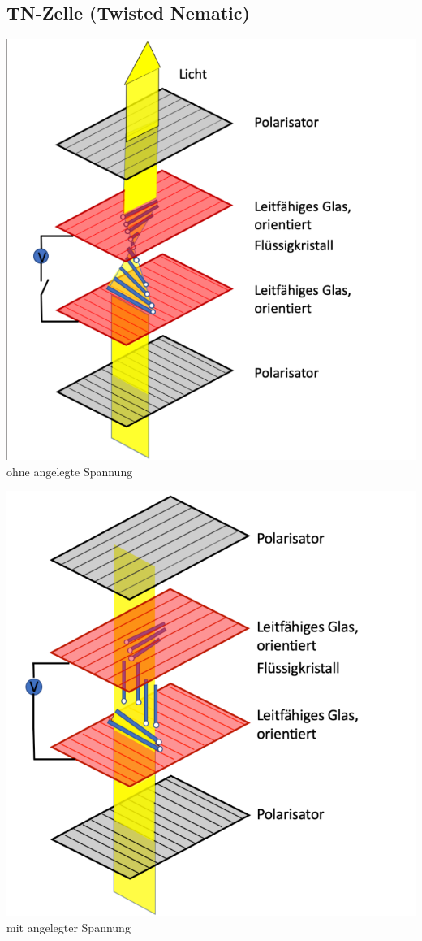 \subsection{TN-Zelle (Twisted Nematic)}
\begin{minipage}[t]{0.5\linewidth}
    \includegraphics[width=\linewidth]{pictures/TN-Zelle1.png}
    ohne angelegte Spannung
\end{minipage}
\begin{minipage}[t]{0.5\linewidth}
    \includegraphics[width=\linewidth]{pictures/TN-Zelle2.png} 
    mit angelegter Spannung 
\end{minipage}

